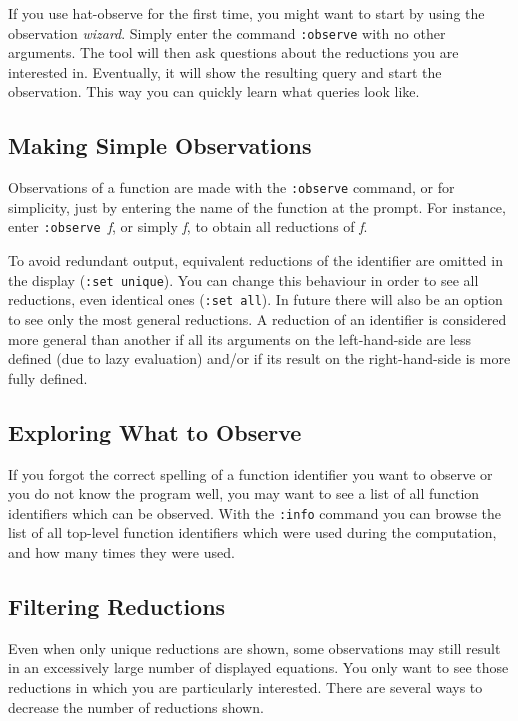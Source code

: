 \documentclass[12pt]{article}
\newcommand{\com}[1]{\texttt{#1}}
\begin{document}
If you use hat-observe for the first time, you might want to start
by using the observation \emph{wizard}. Simply enter the command
\com{:observe} with no other arguments. The tool will then ask
questions about the reductions you are interested in. Eventually,
it will show the resulting query and start the observation.  This way
you can quickly learn what queries look like.

\subsection{Making Simple Observations}

Observations of a function are made with the \com{:observe} command,
or for simplicity, just by entering the name of the function at
the prompt.  For instance, enter \com{:observe}~\emph{f}, or simply
\emph{f}, to obtain all reductions of \emph{f}.

To avoid redundant output, equivalent reductions of the identifier
are omitted in the display (\com{:set unique}).  You can change
this behaviour in order to see all reductions, even identical ones
(\com{:set all}).  In future there will also be an option to see
only the most general reductions.  A reduction of an identifier is
considered more general than another if all its arguments on the
left-hand-side are less defined (due to lazy evaluation) and/or if
its result on the right-hand-side is more fully defined.

\subsection{Exploring What to Observe}

If you forgot the correct spelling of a function identifier you want
to observe or you do not know the program well, you may want to see
a list of all function identifiers which can be observed.  With the
\com{:info} command you can browse the list of all top-level function
identifiers which were used during the computation, and how many times
they were used.

\subsection{Filtering Reductions}

Even when only unique reductions are shown, some observations may still
result in an excessively large number of displayed equations. You only
want to see those reductions in which you are particularly interested.
There are several ways to decrease the number of reductions shown.
\end{document}
